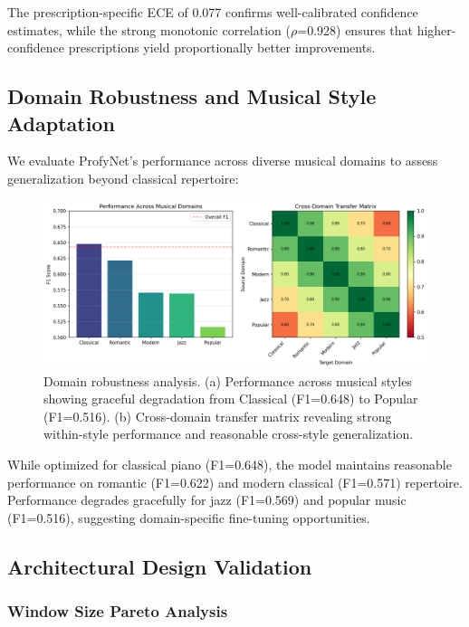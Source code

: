 \documentclass[sigconf,review,anonymous]{acmart}
\begin{document}
The prescription-specific ECE of 0.077 confirms well-calibrated confidence estimates, while the strong monotonic correlation ($\rho$=0.928) ensures that higher-confidence prescriptions yield proportionally better improvements.

\subsection{Domain Robustness and Musical Style Adaptation}

We evaluate ProfyNet's performance across diverse musical domains to assess generalization beyond classical repertoire:

\begin{figure}[h]
\centering
\includegraphics[width=\columnwidth]{figures/domain_robustness.png}
\caption{Domain robustness analysis. (a) Performance across musical styles showing graceful degradation from Classical (F1=0.648) to Popular (F1=0.516). (b) Cross-domain transfer matrix revealing strong within-style performance and reasonable cross-style generalization.}
\label{fig:domain_robustness}
\end{figure}

While optimized for classical piano (F1=0.648), the model maintains reasonable performance on romantic (F1=0.622) and modern classical (F1=0.571) repertoire. Performance degrades gracefully for jazz (F1=0.569) and popular music (F1=0.516), suggesting domain-specific fine-tuning opportunities.

\subsection{Architectural Design Validation}

\subsubsection{Window Size Pareto Analysis}
\end{document}
